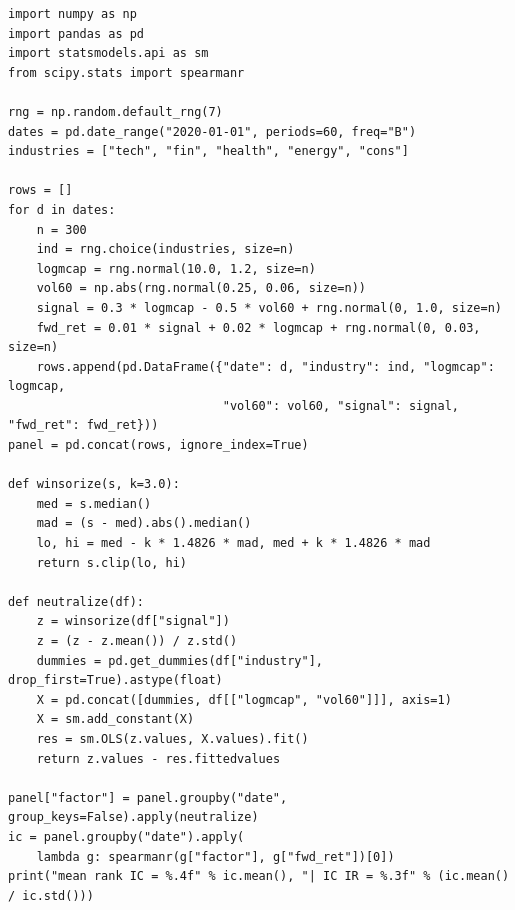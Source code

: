 \begin{lstlisting}[style=pythonstyle,
                   caption={因子去极值、标准化、行业与风格中性化及 IC 计算},
                   label={lst:07-neutralize}]
import numpy as np
import pandas as pd
import statsmodels.api as sm
from scipy.stats import spearmanr

rng = np.random.default_rng(7)
dates = pd.date_range("2020-01-01", periods=60, freq="B")
industries = ["tech", "fin", "health", "energy", "cons"]

rows = []
for d in dates:
    n = 300
    ind = rng.choice(industries, size=n)
    logmcap = rng.normal(10.0, 1.2, size=n)
    vol60 = np.abs(rng.normal(0.25, 0.06, size=n))
    signal = 0.3 * logmcap - 0.5 * vol60 + rng.normal(0, 1.0, size=n)
    fwd_ret = 0.01 * signal + 0.02 * logmcap + rng.normal(0, 0.03, size=n)
    rows.append(pd.DataFrame({"date": d, "industry": ind, "logmcap": logmcap,
                              "vol60": vol60, "signal": signal, "fwd_ret": fwd_ret}))
panel = pd.concat(rows, ignore_index=True)

def winsorize(s, k=3.0):
    med = s.median()
    mad = (s - med).abs().median()
    lo, hi = med - k * 1.4826 * mad, med + k * 1.4826 * mad
    return s.clip(lo, hi)

def neutralize(df):
    z = winsorize(df["signal"])
    z = (z - z.mean()) / z.std()
    dummies = pd.get_dummies(df["industry"], drop_first=True).astype(float)
    X = pd.concat([dummies, df[["logmcap", "vol60"]]], axis=1)
    X = sm.add_constant(X)
    res = sm.OLS(z.values, X.values).fit()
    return z.values - res.fittedvalues

panel["factor"] = panel.groupby("date", group_keys=False).apply(neutralize)
ic = panel.groupby("date").apply(
    lambda g: spearmanr(g["factor"], g["fwd_ret"])[0])
print("mean rank IC = %.4f" % ic.mean(), "| IC IR = %.3f" % (ic.mean() / ic.std()))
\end{lstlisting}

